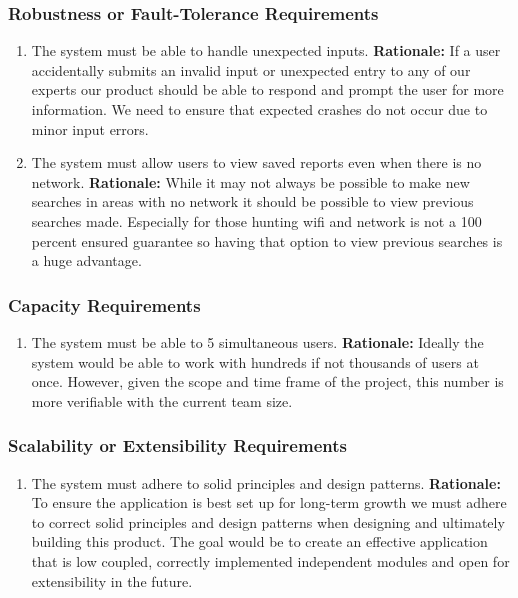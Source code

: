 \documentclass[]{article}
\begin{document}
\subsubsection{Robustness or Fault-Tolerance Requirements}
\label{ssub:robustness_or_fault_tolerance_requirements}
\begin{enumerate}[{PR-RFT}1. ]
	\item The system must be able to handle unexpected inputs. 
	\textbf{Rationale:} If a user accidentally submits an invalid input or unexpected entry to any of our experts our product should be able to respond and prompt the user for more information. We need to ensure that expected crashes do not occur due to minor input errors. 
	\item The system must allow users to view saved reports even when there is no network.
	\textbf{Rationale:} While it may not always be possible to make new searches in areas with no network it should be possible to view previous searches made. Especially for those hunting wifi and network is not a 100 percent ensured guarantee so having that option to view previous searches is a huge advantage. 
\end{enumerate}

\subsubsection{Capacity Requirements}
\label{ssub:capacity_requirements}
\begin{enumerate}[{PR-C}1. ]
	\item The system must be able to 5 simultaneous users.
	\textbf{Rationale:} Ideally the system would be able to work with hundreds if not thousands of users at once. However, given the scope and time frame of the project, this number is more verifiable with the current team size. 
\end{enumerate}

\subsubsection{Scalability or Extensibility Requirements}
\label{ssub:scalability_or_extensibility_requirements}
\begin{enumerate}[{PR-SE}1. ]
	\item The system must adhere to solid principles and design patterns.
	\textbf{Rationale:} To ensure the application is best set up for long-term growth we must adhere to correct solid principles and design patterns when designing and ultimately building this product. The goal would be to create an effective application that is low coupled, correctly implemented independent modules and open for extensibility in the future. 
\end{enumerate}
\end{document}
